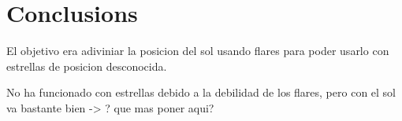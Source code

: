 \chapter{Conclusions}

El objetivo era adiviniar la posicion del sol usando flares para poder usarlo con estrellas de posicion desconocida.

No ha funcionado con estrellas debido a la debilidad de los flares, pero con el sol va bastante bien -> ? que mas poner aqui?

